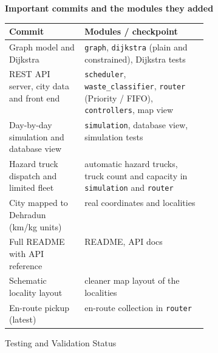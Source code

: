 \documentclass[12pt,a4paper]{article}
\renewcommand{\arraystretch}{1}
\newcommand{\sectiontitle}[1]{%
    {\color{GEUBlue}
    \fontsize{18}{22}\selectfont #1}
}
\begin{document}
{\vspace{3mm}
\textbf{Important commits and the modules they added}

\vspace{1mm}
{\fontsize{10}{12.5}\selectfont
\renewcommand{\arraystretch}{1.15}
\begin{tabularx}{\linewidth}{@{}>{\raggedright\arraybackslash}p{0.38\linewidth}>{\raggedright\arraybackslash}X@{}}
\hline
\textbf{Commit} & \textbf{Modules / checkpoint}\\
\hline
Graph model and Dijkstra & \texttt{graph}, \texttt{dijkstra} (plain and constrained), Dijkstra tests\\
REST API server, city data and front end & \texttt{scheduler}, \texttt{waste\_classifier}, \texttt{router} (Priority / FIFO), \texttt{controllers}, map view\\
Day-by-day simulation and database view & \texttt{simulation}, database view, simulation tests\\
Hazard truck dispatch and limited fleet & automatic hazard trucks, truck count and capacity in \texttt{simulation} and \texttt{router}\\
City mapped to Dehradun (km/kg units) & real coordinates and localities\\
Full README with API reference & README, API docs\\
Schematic locality layout & cleaner map layout of the localities\\
En-route pickup (latest) & en-route collection in \texttt{router}\\
\hline
\end{tabularx}}}

\newpage

\sectiontitle{Testing and Validation Status}

\vspace{0.05cm}


\vspace{0.30cm}
\end{document}
